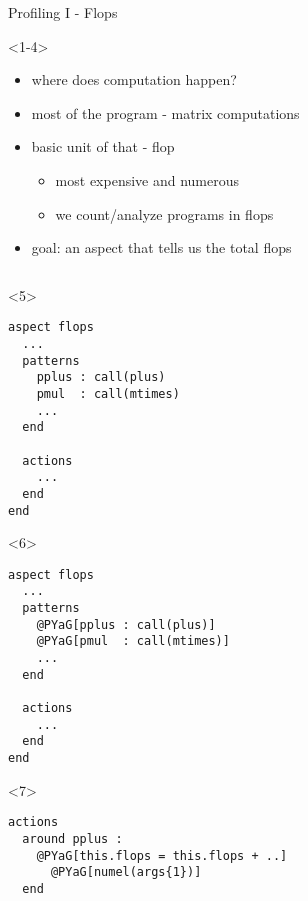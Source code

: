 \begin{frame}[fragile]{Profiling I - Flops}
  \begin{onlyenv}<1-4>
    \vspace{4ex}
    \begin{itemize}
    \item where does computation happen?
    \pause \item most of the program - matrix computations
    \pause \item basic unit of that - flop
      \begin{itemize}
      \item most expensive and numerous
      \item we count/analyze programs in flops
      \end{itemize}
    \pause \item goal: an aspect that tells us the total flops
    \end{itemize}
  \end{onlyenv}
    \begin{columns}
      \begin{column}[T]{5cm}
        \begin{onlyenv}<5>
          \begin{Verbatim}[commandchars=@\[\]]
aspect flops
  ...
  patterns
    pplus : call(plus)
    pmul  : call(mtimes)
    ...
  end

  actions
    ...
  end
end
        \end{Verbatim}
      \end{onlyenv}
        \begin{onlyenv}<6>
          \begin{Verbatim}[commandchars=@\[\]]
aspect flops
  ...
  patterns
    @PYaG[pplus : call(plus)]
    @PYaG[pmul  : call(mtimes)]
    ...
  end

  actions
    ...
  end
end
        \end{Verbatim}
      \end{onlyenv}
        \begin{onlyenv}<7>
          \begin{Verbatim}[commandchars=@\[\]]
actions
  around pplus : 
    @PYaG[this.flops = this.flops + ..]
      @PYaG[numel(args{1})]
  end
        

\end{Verbatim}
\end{onlyenv}
\end{column}
\end{columns}
\end{frame}
